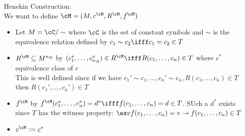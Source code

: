 \noindent
Henekin Construction: \\
We want to define $\cM = (M, c^{\cM}, R^{\cM}, f^{\cM})$ 
\begin{itemize}
    \item Let $M = \cC/\sim$ where $\cC$ is the set of constant symbols and $\sim$ is the equivalence relation defined by $c_1 \sim c_2 \ifff c_1 = c_2 \in T$ 
    \item $R^{\cM} \subseteq M^{n_R}$ by $(c_1^*, \ldots, c_{n_R}^*) \in R^{\cM} \ifff R(c_1, \ldots, c_n) \in T$ where $c^*$ equivalence class of $c$ \\
    This is well defined since if we have $c_1' \sim c_1 , \ldots, c_n' \sim c_n, R(c_1, \ldots, c_n) \in T$ then $R(c_1', \ldots, c_n') \in T$
    \item $f^{\cM}$ by $f^{\cM}(c_1^*, \ldots, c_n^*)=d^* \ifff f(c_1, \ldots, c_n)=d \in T$. SUch a $d^*$ exists since $T$ has the witness property: $\ex v f(c_1, \ldots, c_n)=v \to f(c_1, \ldots, c_n) \in T$
    \item $c^{\cM}:=c^*$
\end{itemize}

